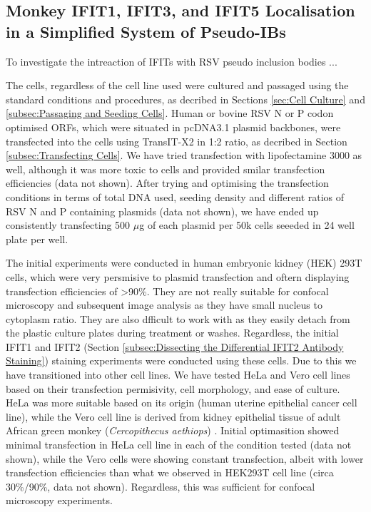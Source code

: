 \subsection{Monkey IFIT1, IFIT3, and IFIT5 Localisation in a Simplified System of Pseudo-IBs} \label{subsec:Monkey IFIT1, IFIT3, and IFIT5 Localisation in a Simplified System of Pseudo-IBs}


To investigate the intreaction of IFITs with RSV pseudo inclusion bodies ...

The cells, regardless of the cell line used were cultured and passaged using the standard conditions and procedures, as decribed in Sections \ref{sec:Cell Culture} and \ref{subsec:Passaging and Seeding Cells}. Human or bovine RSV N or P codon optimised ORFs, which were situated in pcDNA3.1 plasmid backbones, were transfected into the cells using TransIT-X2 in 1:2 ratio, as decribed in Section \ref{subsec:Transfecting Cells}. We have tried transfection with lipofectamine 3000 as well, although it was more toxic to cells and provided smilar transfection efficiencies (data not shown). After trying and optimising the transfection conditions in terms of total DNA used, seeding density and different ratios of RSV N and P containing plasmids (data not shown), we have ended up consistently transfecting 500 $\mu$g of each plasmid per 50k cells seeeded in 24 well plate per well.


The initial experiments were conducted in human embryonic kidney (HEK) 293T cells, which were very persmisive to plasmid transfection and oftern displaying transfection efficiencies of >90\%. They are not really suitable for confocal microscopy and subsequent image analysis as they have small nucleus to cytoplasm ratio. They are also dfficult to work with as they easily detach from the plastic culture plates during treatment or washes. Regardless, the initial IFIT1 and IFIT2 (Section \ref{subsec:Dissecting the Differential IFIT2 Antibody Staining}) staining experiments were conducted using these cells. Due to this we have transitioned into other cell lines. We have tested HeLa and Vero cell lines based on their transfection permisivity, cell morphology, and ease of culture. HeLa was more suitable based on its origin (human uterine epithelial cancer cell line), while the Vero cell line is derived from kidney epithelial tissue of adult African green monkey (\textit{Cercopithecus aethiops}) \cite{Simizu1967CharacterizationVero}. Initial optimasition showed minimal transfection in HeLa cell line in each of the condition tested (data not shown), while the Vero cells were showing constant transfection, albeit with lower transfection efficiencies than what we observed in HEK293T cell line (circa 30\%/90\%, data not shown). Regardless, this was sufficient for confocal microscopy experiments.

